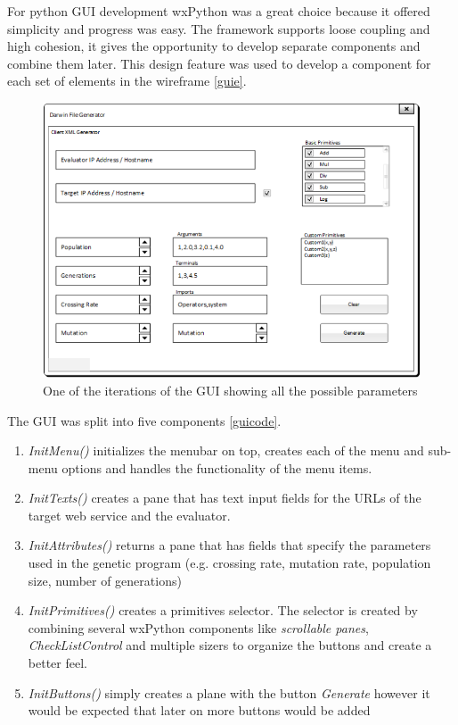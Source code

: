 For python GUI development wxPython was a great choice because it offered simplicity and progress was easy.
The framework supports loose coupling and high cohesion, it gives the opportunity to develop separate components
and combine them later. This design feature was used to develop a component for each set of elements in the
wireframe \ref{guie}. 

\begin{figure}[htp]
\centering
\includegraphics[scale=0.6]{Figures/guiit.png}
\caption{One of the iterations of the GUI showing all the possible parameters}
\label{fig:guie}
\end{figure}

The GUI was split into five components \ref{guicode}.

\begin{enumerate}
	\item \textit{InitMenu()} initializes the menubar on top, creates each of the menu and sub-menu options and 
	handles the functionality of the menu items.
	\item \textit{InitTexts()} creates a pane that has text input fields for the URLs of the target web service and 
	the evaluator.
	\item \textit{InitAttributes()} returns a pane that has fields that specify the parameters used in the genetic program (e.g. crossing rate, mutation rate, population size, number of generations)
	\item \textit{InitPrimitives()} creates a primitives selector. The selector is created by combining several wxPython components like \textit{scrollable panes}, \textit{CheckListControl} and multiple
	sizers to organize the buttons and create a better feel.
	\item \textit{InitButtons()} simply creates a plane with the button \textit{Generate} however it would be expected that later on more buttons would be added
\end{enumerate} 


